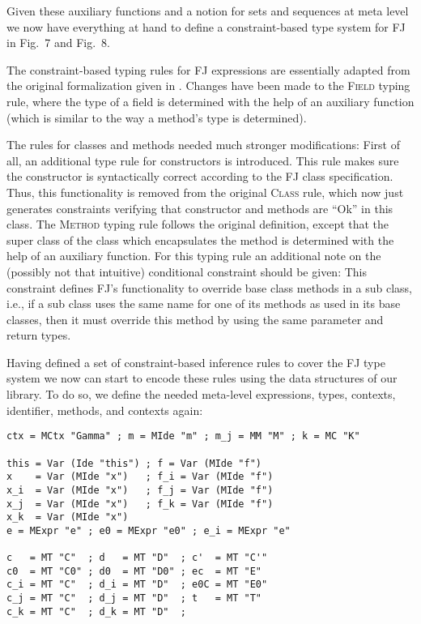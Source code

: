 \bigskip

Given these auxiliary functions and a notion for sets and sequences at
meta level we now have everything at hand to define a constraint-based
type system for \textsc{FJ} in Fig.~7 and Fig.~8.



The constraint-based typing rules for \textsc{FJ} expressions are
essentially adapted from the original formalization given in
\cite{FJ01}. Changes have been made to the \textsc{Field} typing rule,
where the type of a field is determined with the help of an auxiliary
function (which is similar to the way a method's type is determined).

The rules for classes and methods needed much stronger modifications:
First of all, an additional type rule for constructors is
introduced. This rule makes sure the constructor is syntactically
correct according to the \textsc{FJ} class specification. Thus, this
functionality is removed from the original \textsc{Class} rule, which
now just generates constraints verifying that constructor and methods
are ``Ok'' in this class. The \textsc{Method} typing rule follows the
original definition, except that the super class of the class which
encapsulates the method is determined with the help of an auxiliary
function. For this typing rule an additional note on the (possibly not
that intuitive) conditional constraint should be given: This
constraint defines \textsc{FJ}'s functionality to override base class
methods in a sub class, i.e., if a sub class uses the same name for
one of its methods as used in its base classes, then it must override
this method by using the same parameter and return types.



Having defined a set of constraint-based inference rules to cover the
\textsc{FJ} type system we now can start to encode these rules using
the data structures of our library. To do so, we define the needed
meta-level expressions, types, contexts, identifier, methods, and
contexts again:

\begin{lstlisting}
ctx = MCtx "Gamma" ; m = MIde "m" ; m_j = MM "M" ; k = MC "K"

this = Var (Ide "this") ; f = Var (MIde "f")
x    = Var (MIde "x")   ; f_i = Var (MIde "f")
x_i  = Var (MIde "x")   ; f_j = Var (MIde "f")
x_j  = Var (MIde "x")   ; f_k = Var (MIde "f") 
x_k  = Var (MIde "x")
e = MExpr "e" ; e0 = MExpr "e0" ; e_i = MExpr "e"

c   = MT "C"  ; d   = MT "D"  ; c'  = MT "C'" 
c0  = MT "C0" ; d0  = MT "D0" ; ec  = MT "E"
c_i = MT "C"  ; d_i = MT "D"  ; e0C = MT "E0"
c_j = MT "C"  ; d_j = MT "D"  ; t   = MT "T"
c_k = MT "C"  ; d_k = MT "D"  ;
\end{lstlisting}


